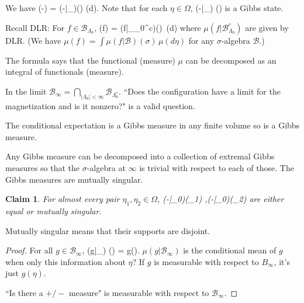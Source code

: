 \documentclass[12pt]{book}
\newtheorem{clm}[thm]{Claim}
\theoremstyle{norm}
\begin{document}
We have
\be
\mu(-) = \int \mu(-|_\infty)(\eta) \mu(d\eta).
\ee
Note that for each $\eta\in \Omega$, 
\be
\mu(-|_\infty) (\eta)
\ee
is a Gibbs state.

Recall DLR: For $f\in \mathcal{B}_{\Lambda_0}$, 
\be
\mu(f) = \int \mu(f|_{\Lambda_0^c})(\eta) \,\mu(d\eta)
\ee
where $\mu(f|\mathcal{B}_{\Lambda_0}^c)$ are given by DLR.
(We have $\mu(f) = \int \mu(f| \mathcal{B})(\sigma)\,\mu(d\eta)$ for any $\sigma$-algebra $\mathcal{B}$.) %

The formula says that the  functional (measure) $\mu$ can be decomposed as an integral of functionals (measure). %

In the limit $\mathcal{B}_\infty = \bigcap_{|\Lambda_0|<\infty} \mathcal{B}_{\Lambda_0^c}$. 
``Does the configuration have a limit for the magnetization and is it nonzero?" is a valid question.

The conditional expectation is a Gibbs measure in any finite volume so is a Gibbs measure.

Any Gibbs measure can be decomposed into a collection of extremal Gibbs measures so that the $\sigma$-algebra at $\infty$ is trivial with respect to each of those. %
The Gibbs measures are mutually singular. 


\begin{clm}
For almost every pair $\eta_1, \eta_2\in \Omega$, 
\be
\mu(-|_0)(\eta_1) ,\quad \mu(-|_0)(\eta_2) 
\ee
are either equal or mutually singular. 
\end{clm}
Mutually singular means that their supports are disjoint. 
\begin{proof}
For all $g\in \mathcal{B}_\infty$, 
\be
\mu(g|_\infty) (\eta) = g(\eta).
\ee
$\mu(g|\mathcal{B}_\infty)$ is the conditional mean of $g$ when only this information about $\eta$? If $g$ is measurable with respect to $B_\infty$, it's just $g(\eta)$.

``Is there a $+/-$ measure" is measurable with respect to $\mathcal{B}_{\infty}$.
\end{proof}
\end{document}
